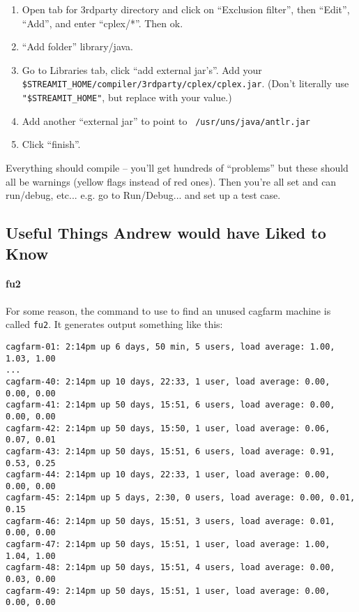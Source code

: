 \begin{enumerate}
\item Open tab for 3rdparty directory and click on ``Exclusion
filter'', then ``Edit'', ``Add'', and enter ``cplex/*''.  Then ok.

\item ``Add folder'' library/java.
  
\item Go to Libraries tab, click ``add external jar's''.  Add your
  {\tt \$STREAMIT\_HOME/compiler/3rdparty\slash{}cplex/cplex.jar}.
  (Don't literally use {\tt "\$STREAMIT\_HOME"}, but replace with your
  value.)

\item Add another ``external jar'' to point to {\tt
/usr/uns/java/antlr.jar}

\item Click ``finish''.
\end{enumerate}

Everything should compile -- you'll get hundreds of ``problems'' but
these should all be warnings (yellow flags instead of red ones).  Then
you're all set and can run/debug, etc... e.g. go to Run/Debug... and
set up a test case.

\subsection{Useful Things Andrew would have Liked to Know}

\paragraph{fu2}
For some reason, the command to use to find an unused cagfarm machine
is called {\tt fu2}. It generates output something like this:
\begin{verbatim}
cagfarm-01: 2:14pm up 6 days, 50 min, 5 users, load average: 1.00, 1.03, 1.00
...
cagfarm-40: 2:14pm up 10 days, 22:33, 1 user, load average: 0.00, 0.00, 0.00
cagfarm-41: 2:14pm up 50 days, 15:51, 6 users, load average: 0.00, 0.00, 0.00
cagfarm-42: 2:14pm up 50 days, 15:50, 1 user, load average: 0.06, 0.07, 0.01
cagfarm-43: 2:14pm up 50 days, 15:51, 6 users, load average: 0.91, 0.53, 0.25
cagfarm-44: 2:14pm up 10 days, 22:33, 1 user, load average: 0.00, 0.00, 0.00
cagfarm-45: 2:14pm up 5 days, 2:30, 0 users, load average: 0.00, 0.01, 0.15
cagfarm-46: 2:14pm up 50 days, 15:51, 3 users, load average: 0.01, 0.00, 0.00
cagfarm-47: 2:14pm up 50 days, 15:51, 1 user, load average: 1.00, 1.04, 1.00
cagfarm-48: 2:14pm up 50 days, 15:51, 4 users, load average: 0.00, 0.03, 0.00
cagfarm-49: 2:14pm up 50 days, 15:51, 1 user, load average: 0.00, 0.00, 0.00
\end{verbatim}


